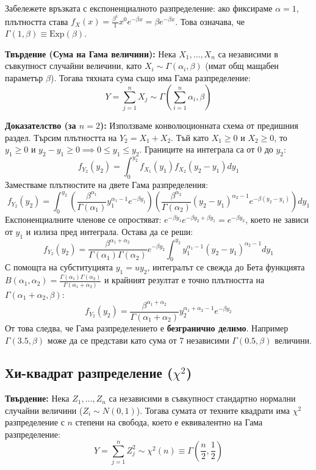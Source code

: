 \documentclass{article}
\begin{document}
Забележете връзката с експоненциалното разпределение: ако фиксираме $\alpha = 1$, плътността става $f_X(x) = \frac{\beta^1}{1} x^{0} e^{-\beta x} = \beta e^{-\beta x}$. Това означава, че $\Gamma(1, \beta) \equiv \text{Exp}(\beta)$.

\textbf{Твърдение (Сума на Гама величини):} Нека $X_1, \dots, X_n$ са независими в съвкупност случайни величини, като $X_i \sim \Gamma(\alpha_i, \beta)$ (имат общ мащабен параметър $\beta$). Тогава тяхната сума също има Гама разпределение:
\[
Y = \sum_{j=1}^n X_j \sim \Gamma\left(\sum_{i=1}^n \alpha_i, \beta\right)
\]

\textbf{Доказателство (за $n=2$):}
Използваме конволюционната схема от предишния раздел. Търсим плътността на $Y_2 = X_1 + X_2$. Тъй като $X_1 \ge 0$ и $X_2 \ge 0$, то $y_1 \ge 0$ и $y_2 - y_1 \ge 0 \implies 0 \le y_1 \le y_2$. Границите на интеграла са от $0$ до $y_2$:
\[
f_{Y_2}(y_2) = \int_{0}^{y_2} f_{X_1}(y_1) f_{X_2}(y_2 - y_1) dy_1
\]
Заместваме плътностите на двете Гама разпределения:
\[
f_{Y_2}(y_2) = \int_{0}^{y_2} \left( \frac{\beta^{\alpha_1}}{\Gamma(\alpha_1)} y_1^{\alpha_1 - 1} e^{-\beta y_1} \right) \left( \frac{\beta^{\alpha_2}}{\Gamma(\alpha_2)} (y_2 - y_1)^{\alpha_2 - 1} e^{-\beta (y_2 - y_1)} \right) dy_1
\]
Експоненциалните членове се опростяват: $e^{-\beta y_1} e^{-\beta y_2 + \beta y_1} = e^{-\beta y_2}$, което не зависи от $y_1$ и излиза пред интеграла. Остава да се реши:
\[
f_{Y_2}(y_2) = \frac{\beta^{\alpha_1+\alpha_2}}{\Gamma(\alpha_1)\Gamma(\alpha_2)} e^{-\beta y_2} \int_{0}^{y_2} y_1^{\alpha_1 - 1} (y_2 - y_1)^{\alpha_2 - 1} dy_1
\]
С помощта на субституцията $y_1 = u y_2$, интегралът се свежда до Бета функцията $B(\alpha_1, \alpha_2) = \frac{\Gamma(\alpha_1)\Gamma(\alpha_2)}{\Gamma(\alpha_1+\alpha_2)}$ и крайният резултат е точно плътността на $\Gamma(\alpha_1+\alpha_2, \beta)$:
\[
f_{Y_2}(y_2) = \frac{\beta^{\alpha_1+\alpha_2}}{\Gamma(\alpha_1+\alpha_2)} y_2^{\alpha_1+\alpha_2-1} e^{-\beta y_2}
\]
От това следва, че Гама разпределението е \textbf{безгранично делимо}. Например $\Gamma(3.5, \beta)$ може да се представи като сума от 7 независими $\Gamma(0.5, \beta)$ величини.

\subsection{Хи-квадрат разпределение ($\chi^2$)}

\textbf{Твърдение:} Нека $Z_1, \dots, Z_n$ са независими в съвкупност стандартно нормални случайни величини ($Z_i \sim N(0, 1)$). Тогава сумата от техните квадрати има $\chi^2$ разпределение с $n$ степени на свобода, което е еквивалентно на Гама разпределение:
\[
Y = \sum_{j=1}^n Z_j^2 \sim \chi^2(n) \equiv \Gamma\left(\frac{n}{2}, \frac{1}{2}\right)
\]
\end{document}

